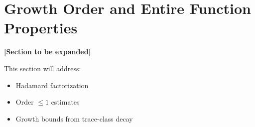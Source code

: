 \section{Growth Order and Entire Function Properties}
\label{sec:growth_order}

\textbf{[Section to be expanded]}

This section will address:
\begin{itemize}
\item Hadamard factorization
\item Order $\leq 1$ estimates
\item Growth bounds from trace-class decay
\end{itemize}
